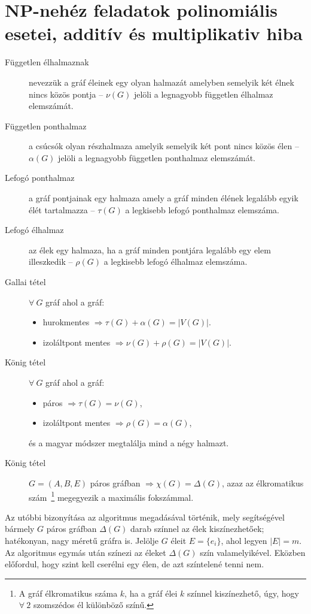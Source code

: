 \section{NP-nehéz feladatok polinomiális esetei, additív és multiplikativ hiba}

\begin{description}
  \item[Független élhalmaznak] nevezzük a gráf éleinek egy olyan halmazát
  amelyben semelyik két élnek nincs közös pontja -- $\nu(G)$ jelöli a legnagyobb
  független élhalmaz elemszámát.
  \item[Független ponthalmaz]  a csúcsók olyan részhalmaza amelyik semelyik két
  pont nincs közös élen -- $\alpha(G)$ jelöli a legnagyobb független ponthalmaz
  elemszámát.
  \item[Lefogó ponthalmaz] a gráf pontjainak egy halmaza amely a gráf minden
  élének legalább egyik élét tartalmazza -- $\tau(G)$ a legkisebb lefogó
  ponthalmaz elemszáma.
  \item[Lefogó élhalmaz] az élek egy halmaza, ha a gráf minden pontjára legalább
  egy elem illeszkedik -- $\rho(G)$ a legkisebb lefogó élhalmaz elemszáma.
  \item[Gallai tétel] $\forall~G$ gráf ahol a gráf: \begin{itemize}
  		\item hurokmentes $\Rightarrow \tau(G)+\alpha(G) = |V(G)|$. 
  		\item izoláltpont mentes $\Rightarrow \nu(G) +\rho(G) = |V(G)|$.
   \end{itemize} 
   \item[König tétel] $\forall~G$ gráf ahol a gráf: \begin{itemize}
     \item páros $\Rightarrow \tau(G)=\nu(G)$,
     \item izoláltpont mentes $\Rightarrow \rho(G) = \alpha(G)$,
   \end{itemize}
   és a magyar módszer megtalálja mind a négy halmazt.
   \item[König tétel] $G=(A,B,E)$ páros gráfban $\Rightarrow \chi(G) =
   \Delta(G)$, azaz az élkromatikus szám~\footnote{A gráf élkromatikus száma
   $k$, ha a gráf élei $k$  színnel kiszínezhető, úgy, hogy $\forall~2$
   szomszédos él különböző színű. } megegyezik a maximális fokszámmal.
\end{description}

Az utóbbi bizonyítása az algoritmus megadásával történik, mely segítségével
bármely $G$ páros gráfban $\Delta(G)$ darab színnel az élek kiszínezhetőek;
hatékonyan, nagy méretű gráfra is. Jelölje $G$ éleit $E=\{ e_i \}$, ahol legyen
$|E|=m$. Az algoritmus egymás után színezi az éleket $\Delta(G)$ szín valamelyikével.
Eközben előfordul, hogy szint kell cserélni egy élen, de azt színtelené tenni nem.

